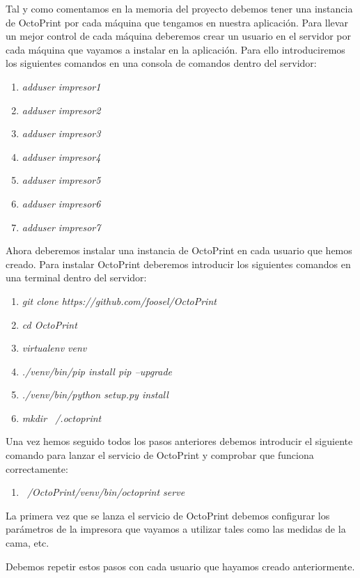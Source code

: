 Tal y como comentamos en la memoria del proyecto debemos tener una instancia de OctoPrint por cada máquina que tengamos en nuestra aplicación.
Para llevar un mejor control de cada máquina deberemos crear un usuario en el servidor por cada máquina que vayamos a instalar en la aplicación. Para ello introduciremos los siguientes comandos en una consola de comandos dentro del servidor:
\begin{enumerate}
\item \emph{adduser impresor1}
\item \emph{adduser impresor2}
\item \emph{adduser impresor3}
\item \emph{adduser impresor4}
\item \emph{adduser impresor5}
\item \emph{adduser impresor6}
\item \emph{adduser impresor7}
\end{enumerate}

Ahora deberemos instalar una instancia de OctoPrint en cada usuario que hemos creado. Para instalar OctoPrint deberemos introducir los siguientes comandos en una terminal dentro del servidor:

\begin{enumerate}
\item \emph{git clone https://github.com/foosel/OctoPrint}
\item \emph{cd OctoPrint}
\item \emph{virtualenv venv}
\item \emph{./venv/bin/pip install pip --upgrade}
\item \emph{./venv/bin/python setup.py install}
\item \emph{mkdir ~/.octoprint}
\end{enumerate}

Una vez hemos seguido todos los pasos anteriores debemos introducir el siguiente comando para lanzar el servicio de OctoPrint y comprobar que funciona correctamente:
\begin{enumerate}
\item \emph{~/OctoPrint/venv/bin/octoprint serve}
\end{enumerate}

La primera vez que se lanza el servicio de OctoPrint debemos configurar los parámetros de la impresora que vayamos a utilizar tales como las medidas de la cama, etc.

Debemos repetir estos pasos con cada usuario que hayamos creado anteriormente.


